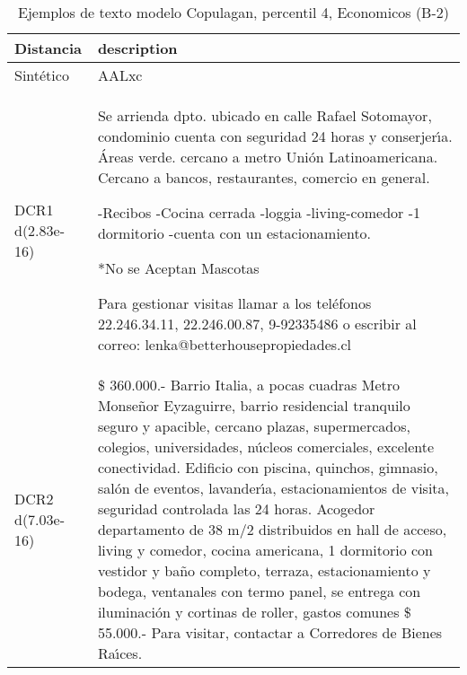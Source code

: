 \begin{table}[H]
\centering
\fontsize{10}{14}\selectfont
\caption{Ejemplos de texto modelo Copulagan, percentil 4, Economicos (B-2)}
\label{table-example-economicos-b-2-copulagan-4p-text}
\begin{tabular}{|l|m{35em}|}
\hline
\rowcolor[gray]{0.8}
Distancia & description \\
\hline Sintético & AALxc \\
\hline DCR1 d(2.83e-16) & Se arrienda dpto. ubicado en calle Rafael Sotomayor, condominio cuenta con seguridad 24 horas y conserjer{\'\i}a. \'Areas verde.
cercano a metro Uni\'on Latinoamericana.
Cercano a bancos, restaurantes, comercio en general.

-Recibos
-Cocina cerrada
-loggia
-living-comedor
-1 dormitorio
-cuenta con un estacionamiento.

*No se Aceptan Mascotas

Para gestionar visitas llamar a los tel\'efonos 22.246.34.11, 22.246.00.87, 9-92335486 o escribir al correo: lenka@betterhousepropiedades.cl
 \\
\hline DCR2 d(7.03e-16) & \$ 360.000.- Barrio Italia, a pocas cuadras Metro Monse\~nor Eyzaguirre, barrio residencial tranquilo seguro y apacible, cercano plazas, supermercados, colegios, universidades, n\'ucleos comerciales, excelente conectividad.   Edificio con piscina, quinchos, gimnasio, sal\'on de eventos, lavander{\'\i}a, estacionamientos de visita, seguridad controlada las 24 horas.  Acogedor departamento de 38 m/2 distribuidos en hall de acceso, living y comedor,  cocina americana, 1 dormitorio con vestidor y ba\~no completo, terraza, estacionamiento y bodega, ventanales con termo panel, se entrega con iluminaci\'on y cortinas de roller, gastos comunes \$ 55.000.- Para visitar, contactar a Corredores de Bienes Ra{\'\i}ces. \\
\hline
\end{tabular}
\end{table}

